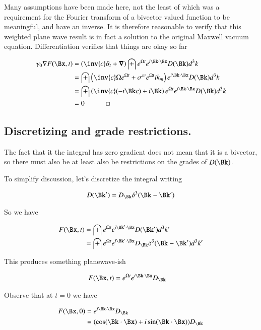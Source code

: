Many assumptions have been made here, not the least of which was a requirement for the Fourier transform of a bivector valued function to be meaningful, and have an inverse.  It is therefore reasonable to verify that this weighted plane wave result is in fact a solution to the original Maxwell vacuum equation.  Differentiation verifies that things are okay so far

\begin{align*}
\gamma_0 \grad F(\Bx,t)
&=
\left(\inv{c}\partial_t + \spacegrad \right)\int e^{\Omega t} e^{i \Bk \cdot \Bx} D(\Bk) d^3 k \\
&=
\int \left(\inv{c}\Omega e^{\Omega t} + \sigma^m e^{\Omega t} i k_m \right) e^{i \Bk \cdot \Bx} D(\Bk) d^3 k \\
&=
\int \left(\inv{c}(-i \Bk c) + i \Bk \right) e^{\Omega t} e^{i \Bk \cdot \Bx} D(\Bk) d^3 k \\
&= 0 \quad\quad\quad\square
\end{align*}

\subsection{Discretizing and grade restrictions.}

The fact that it the integral has zero gradient does not mean that it is a bivector, so there must also be at least also be restrictions on the grades of $D(\Bk)$.

To simplify discussion, let's discretize the integral writing

\begin{align*}
D(\Bk') = D_\Bk \delta^3 (\Bk - \Bk')
\end{align*}

So we have

\begin{align*}
F(\Bx,t)
&= \int e^{\Omega t} e^{i \Bk' \cdot \Bx} D(\Bk') d^3 k' \\
&= \int e^{\Omega t} e^{i \Bk' \cdot \Bx} D_\Bk \delta^3(\Bk - \Bk') d^3 k' \\
\end{align*}

This produces something planewave-ish

\begin{align}\label{eqn:planewaveish}
F(\Bx,t) &= e^{\Omega t} e^{i \Bk \cdot \Bx} D_\Bk
\end{align}

Observe that at $t=0$ we have

\begin{align*}
F(\Bx,0)
&= e^{i \Bk \cdot \Bx} D_\Bk  \\
&= (\cos (\Bk \cdot \Bx) + i \sin(\Bk \cdot \Bx)) D_\Bk  \\
\end{align*}

